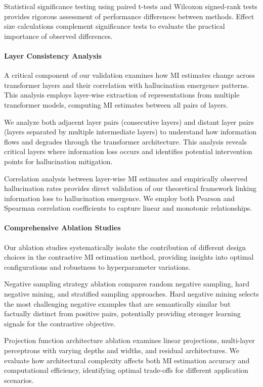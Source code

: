 Statistical significance testing using paired t-tests and Wilcoxon signed-rank tests provides rigorous assessment of performance differences between methods. Effect size calculations complement significance tests to evaluate the practical importance of observed differences.

\paragraph{Layer Consistency Analysis}
A critical component of our validation examines how MI estimates change across transformer layers and their correlation with hallucination emergence patterns. This analysis employs layer-wise extraction of representations from multiple transformer models, computing MI estimates between all pairs of layers.

We analyze both adjacent layer pairs (consecutive layers) and distant layer pairs (layers separated by multiple intermediate layers) to understand how information flows and degrades through the transformer architecture. This analysis reveals critical layers where information loss occurs and identifies potential intervention points for hallucination mitigation.

Correlation analysis between layer-wise MI estimates and empirically observed hallucination rates provides direct validation of our theoretical framework linking information loss to hallucination emergence. We employ both Pearson and Spearman correlation coefficients to capture linear and monotonic relationships.

\paragraph{Comprehensive Ablation Studies}
Our ablation studies systematically isolate the contribution of different design choices in the contrastive MI estimation method, providing insights into optimal configurations and robustness to hyperparameter variations.

Negative sampling strategy ablation compares random negative sampling, hard negative mining, and stratified sampling approaches. Hard negative mining selects the most challenging negative examples that are semantically similar but factually distinct from positive pairs, potentially providing stronger learning signals for the contrastive objective.

Projection function architecture ablation examines linear projections, multi-layer perceptrons with varying depths and widths, and residual architectures. We evaluate how architectural complexity affects both MI estimation accuracy and computational efficiency, identifying optimal trade-offs for different application scenarios.

